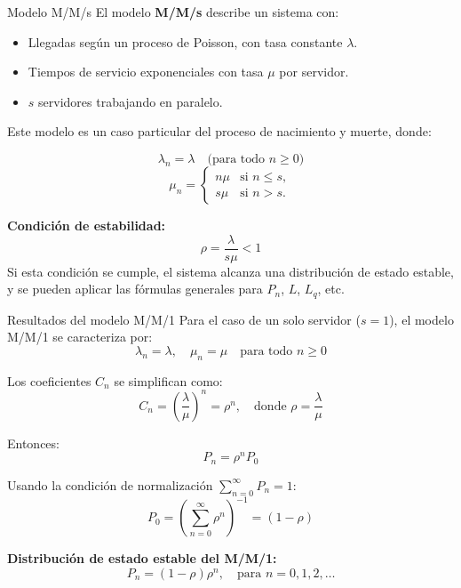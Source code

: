 \documentclass{beamer}
\begin{document}
\begin{frame}{Modelo M/M/s}
\justifying
El modelo \textbf{M/M/s} describe un sistema con:
\begin{itemize}
    \item Llegadas según un proceso de Poisson, con tasa constante $\lambda$.
    \item Tiempos de servicio exponenciales con tasa $\mu$ por servidor.
    \item $s$ servidores trabajando en paralelo.
\end{itemize}

\medskip
Este modelo es un caso particular del proceso de nacimiento y muerte, donde:

\[
\lambda_n = \lambda \quad \text{(para todo $n \geq 0$)}
\]
\[
\mu_n = 
\begin{cases}
n\mu & \text{si } n \leq s, \\
s\mu & \text{si } n > s.
\end{cases}
\]

\medskip
\textbf{Condición de estabilidad:}
\[
\rho = \frac{\lambda}{s\mu} < 1
\]
Si esta condición se cumple, el sistema alcanza una distribución de estado estable, y se pueden aplicar las fórmulas generales para $P_n$, $L$, $L_q$, etc.

\end{frame}

\begin{frame}{Resultados del modelo M/M/1}
\justifying
Para el caso de un solo servidor ($s = 1$), el modelo M/M/1 se caracteriza por:
\[
\lambda_n = \lambda, \quad \mu_n = \mu \quad \text{para todo } n \geq 0
\]

\medskip
Los coeficientes $C_n$ se simplifican como:
\[
C_n = \left( \frac{\lambda}{\mu} \right)^n = \rho^n, \quad \text{donde } \rho = \frac{\lambda}{\mu}
\]

\medskip
Entonces:
\[
P_n = \rho^n P_0
\]

Usando la condición de normalización $\sum_{n=0}^{\infty} P_n = 1$:
\[
P_0 = \left( \sum_{n=0}^{\infty} \rho^n \right)^{-1} = (1 - \rho)
\]

\medskip
\textbf{Distribución de estado estable del M/M/1:}
\[
P_n = (1 - \rho)\rho^n, \quad \text{para } n = 0, 1, 2, \dots
\]
\end{frame}
\end{document}
